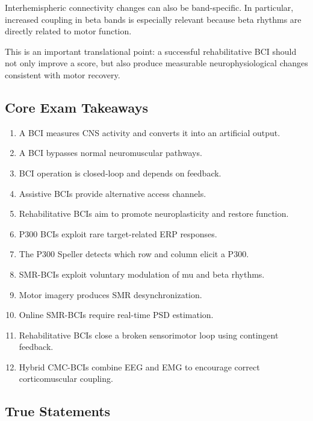 Interhemispheric connectivity changes can also be band-specific. In particular, increased coupling in beta bands is especially relevant because beta rhythms are directly related to motor function.

\begin{authornote}
This is an important translational point: a successful rehabilitative BCI should not only improve a score, but also produce measurable neurophysiological changes consistent with motor recovery.
\end{authornote}

\subsection{Core Exam Takeaways}

\begin{enumerate}
    \item A BCI measures CNS activity and converts it into an artificial output.
    \item A BCI bypasses normal neuromuscular pathways.
    \item BCI operation is closed-loop and depends on feedback.
    \item Assistive BCIs provide alternative access channels.
    \item Rehabilitative BCIs aim to promote neuroplasticity and restore function.
    \item P300 BCIs exploit rare target-related ERP responses.
    \item The P300 Speller detects which row and column elicit a P300.
    \item SMR-BCIs exploit voluntary modulation of mu and beta rhythms.
    \item Motor imagery produces SMR desynchronization.
    \item Online SMR-BCIs require real-time PSD estimation.
    \item Rehabilitative BCIs close a broken sensorimotor loop using contingent feedback.
    \item Hybrid CMC-BCIs combine EEG and EMG to encourage correct corticomuscular coupling.
\end{enumerate}

\subsection{True Statements}


